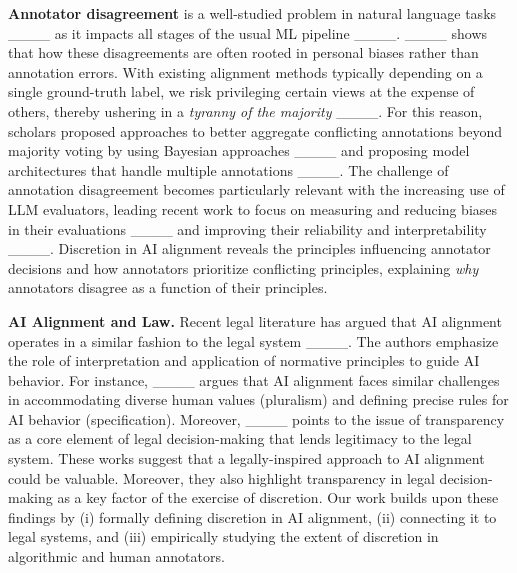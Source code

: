 \noindent \textbf{Annotator disagreement} is a well-studied problem in natural language tasks ____ as it impacts all stages of the usual ML pipeline ____. ____ shows that how these disagreements are often rooted in personal biases rather than annotation errors. With existing alignment methods typically depending on a single ground-truth label, we risk privileging certain views at the expense of others, thereby ushering in a \emph{tyranny of the majority} ____.
For this reason, scholars proposed approaches to better aggregate conflicting annotations beyond majority voting by using Bayesian approaches ____ and proposing model architectures that handle multiple annotations ____.
The challenge of annotation disagreement becomes particularly relevant with the increasing use of LLM evaluators, leading recent work to focus on measuring and reducing biases in their evaluations ____ and improving their reliability and interpretability ____. Discretion in AI alignment reveals the principles influencing annotator decisions and how annotators prioritize conflicting principles, explaining \emph{why} annotators disagree as a function of their principles. 



\noindent \textbf{AI Alignment and Law.} Recent legal literature has argued that AI alignment operates in a similar fashion to the legal system ____. The authors emphasize the role of interpretation and application of normative principles to guide AI behavior. For instance, ____ argues that AI alignment faces similar challenges in accommodating diverse human values (pluralism) and defining precise rules for AI behavior (specification). Moreover, ____ points to the issue of transparency as a core element of legal decision-making that lends legitimacy to the legal system.
These works suggest that a legally-inspired approach to AI alignment could be valuable. Moreover, they also highlight transparency in legal decision-making as a key factor of the exercise of discretion.
Our work builds upon these findings by (i) formally defining discretion in AI alignment, (ii) connecting it to legal systems, and (iii) empirically studying the extent of discretion in algorithmic and human annotators.